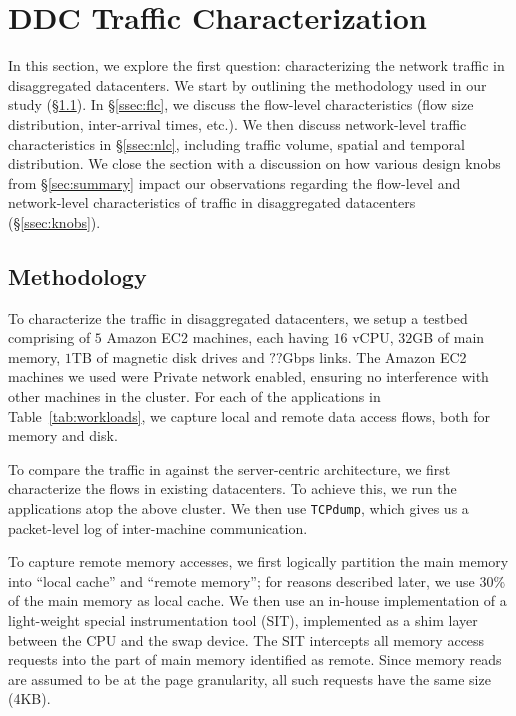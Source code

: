 \section{DDC Traffic Characterization}
\label{sec:workloads}
In this section, we explore the first question: characterizing the network traffic in disaggregated datacenters. We start by outlining the methodology used in our study (\S\ref{ssec:method1}). In \S\ref{ssec:flc}, we discuss the flow-level characteristics (flow size distribution, inter-arrival times, etc.). We then discuss network-level traffic characteristics in \S\ref{ssec:nlc}, including traffic volume, spatial and temporal distribution. We close the section with a discussion on how various design knobs from \S\ref{sec:summary} impact our observations regarding the flow-level and network-level characteristics of traffic in disaggregated datacenters (\S\ref{ssec:knobs}).

\subsection{Methodology}
\label{ssec:method1} 
To characterize the traffic in disaggregated datacenters, we setup a testbed comprising of $5$ Amazon EC2 machines, each having $16$ vCPU, $32$GB of main memory, $1$TB of magnetic disk drives and $??$Gbps links. The Amazon EC2 machines we used were Private network enabled, ensuring no interference with other machines in the cluster.  For each of the applications in Table~\ref{tab:workloads}, we capture local and remote data access flows, both for memory and disk.

To compare the traffic in \dis against the server-centric architecture, we first characterize the flows in existing datacenters. To achieve this, we run the applications atop the above cluster. We then use {\tt TCPdump}, which gives us a packet-level log of inter-machine communication. 

To capture remote memory accesses, we first logically partition the main memory into ``local cache'' and ``remote memory''; for reasons described later, we use $30\%$ of the main memory as local cache. We then use an in-house implementation of a light-weight special instrumentation tool (SIT), implemented as a shim layer between the CPU and the swap device. The SIT intercepts all memory access requests into the part of main memory identified as remote. Since memory reads are assumed to be at the page granularity, all such requests have the same size (4KB).  

